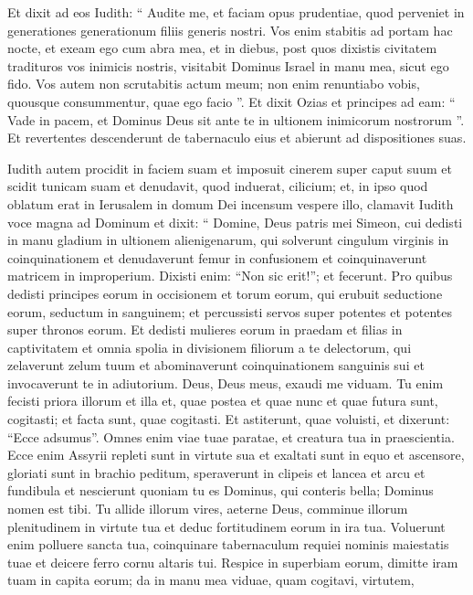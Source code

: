 \begin{biblechapter}
\begin{biblechapter}
\begin{biblechapter}
\begin{biblechapter}
\begin{biblechapter}
\begin{biblechapter}
\begin{biblechapter}
\begin{biblechapter}
 \verse Et dixit ad eos Iudith: “ Audite me, et faciam opus prudentiae, quod perveniet in generationes generationum filiis generis nostri. 
\verse Vos enim stabitis ad portam hac nocte, et exeam ego cum abra mea, et in diebus, post quos dixistis civitatem tradituros vos inimicis nostris, visitabit Dominus Israel in manu mea, sicut ego fido. 
\verse Vos autem non scrutabitis actum meum; non enim renuntiabo vobis, quousque consummentur, quae ego facio ”. 
\verse Et dixit Ozias et principes ad eam: “ Vade in pacem, et Dominus Deus sit ante te in ultionem inimicorum nostrorum ”. 
\verse Et revertentes descenderunt de tabernaculo eius et abierunt ad dispositiones suas.
 
\begin{biblechapter}
\verse Iudith autem procidit in faciem suam et imposuit cinerem super caput suum et scidit tunicam suam et denudavit, quod induerat, cilicium; et, in ipso quod oblatum erat in Ierusalem in domum Dei incensum vespere illo, clamavit Iudith voce magna ad Dominum et dixit: 
\verse “ Domine, Deus patris mei Simeon, cui dedisti in manu gladium in ultionem alienigenarum, qui solverunt cingulum virginis in coinquinationem et denudaverunt femur in confusionem et coinquinaverunt matricem in improperium. Dixisti enim: “Non sic erit!”; et fecerunt. 
\verse Pro quibus dedisti principes eorum in occisionem et torum eorum, qui erubuit seductione eorum, seductum in sanguinem; et percussisti servos super potentes et potentes super thronos eorum. 
\verse Et dedisti mulieres eorum in praedam et filias in captivitatem et omnia spolia in divisionem filiorum a te delectorum, qui zelaverunt zelum tuum et abominaverunt coinquinationem sanguinis sui et invocaverunt te in adiutorium. Deus, Deus meus, exaudi me viduam. 
\verse Tu enim fecisti priora illorum et illa et, quae postea et quae nunc et quae futura sunt, cogitasti; et facta sunt, quae cogitasti. 
\verse Et astiterunt, quae voluisti, et dixerunt: “Ecce adsumus”. Omnes enim viae tuae paratae, et creatura tua in praescientia.
 \verse Ecce enim Assyrii repleti sunt in virtute sua et exaltati sunt in equo et ascensore, gloriati sunt in brachio peditum, speraverunt in clipeis et lancea et arcu et fundibula et nescierunt quoniam tu es Dominus, qui conteris bella; 
\verse Dominus nomen est tibi. Tu allide illorum vires, aeterne Deus, comminue illorum plenitudinem in virtute tua et deduc fortitudinem eorum in ira tua. Voluerunt enim polluere sancta tua, coinquinare tabernaculum requiei nominis maiestatis tuae et deicere ferro cornu altaris tui. 
\verse Respice in superbiam eorum, dimitte iram tuam in capita eorum; da in manu mea viduae, quam cogitavi, virtutem, 

\end{biblechapter}
\end{biblechapter}
\end{biblechapter}
\end{biblechapter}
\end{biblechapter}
\end{biblechapter}
\end{biblechapter}
\end{biblechapter}
\end{biblechapter}
